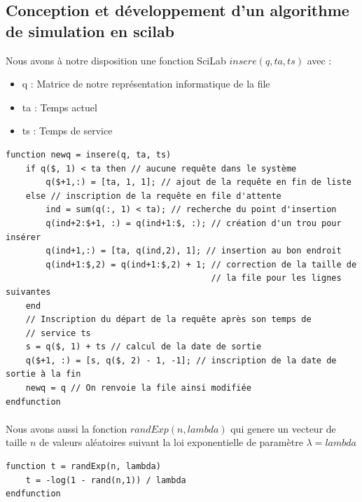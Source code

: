 \documentclass{article}
\begin{document}
\subsection{Conception et développement d'un algorithme de simulation en scilab}
Nous avons à notre disposition une fonction SciLab $insere(q, ta, ts)$ avec :
\begin{itemize}
\item q : Matrice de notre représentation informatique de la file
\item ta : Temps actuel
\item ts : Temps de service
\end{itemize}
\begin{verbatim}
function newq = insere(q, ta, ts)
    if q($, 1) < ta then // aucune requête dans le système
        q($+1,:) = [ta, 1, 1]; // ajout de la requête en fin de liste
    else // inscription de la requête en file d'attente
        ind = sum(q(:, 1) < ta); // recherche du point d'insertion
        q(ind+2:$+1, :) = q(ind+1:$, :); // création d'un trou pour insérer
        q(ind+1,:) = [ta, q(ind,2), 1]; // insertion au bon endroit
        q(ind+1:$,2) = q(ind+1:$,2) + 1; // correction de la taille de
                                         // la file pour les lignes suivantes
    end
    // Inscription du départ de la requête après son temps de
    // service ts
    s = q($, 1) + ts // calcul de la date de sortie
    q($+1, :) = [s, q($, 2) - 1, -1]; // inscription de la date de sortie à la fin
    newq = q // On renvoie la file ainsi modifiée
endfunction
\end{verbatim}
\paragraph{}
Nous avons aussi la fonction $randExp(n,lambda)$ qui genere un vecteur de taille $n$ de valeurs aléatoires suivant la loi exponentielle de paramètre $\lambda=lambda$
\begin{verbatim}
function t = randExp(n, lambda)
    t = -log(1 - rand(n,1)) / lambda
endfunction
\end{verbatim}
\end{document}
